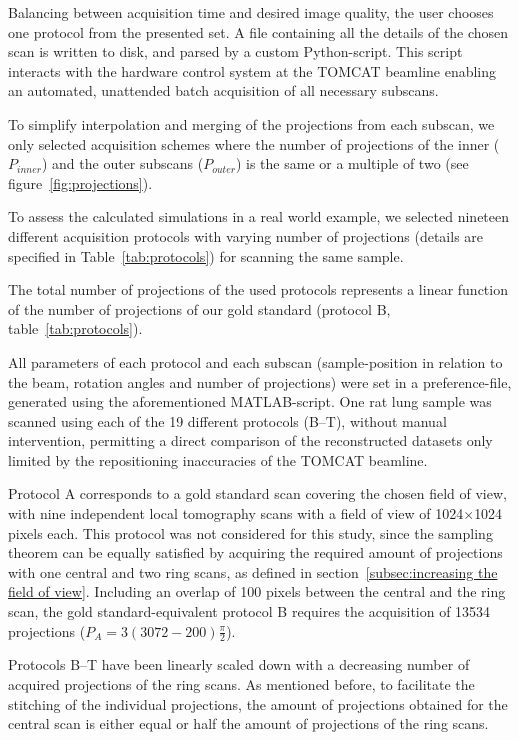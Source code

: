 Balancing between acquisition time and desired image quality, the user chooses one protocol from the presented set. A file containing all the details of the chosen scan is written to disk, and parsed by a custom Python-script. This script interacts with the hardware control system at the TOMCAT beamline enabling an automated, unattended batch acquisition of all necessary subscans.

To simplify interpolation and merging of the projections from each subscan, we only selected acquisition schemes where the number of projections of the inner ($P_{inner}$) and the outer subscans ($P_{outer}$) is the same or a multiple of two (see figure~\ref{fig:projections}).

To assess the calculated simulations in a real world example, we selected nineteen different acquisition protocols with varying number of projections (details are specified in Table~\ref{tab:protocols}) for scanning the same sample. 

The total number of projections of the used protocols represents a linear function of the number of projections of our gold standard (protocol B, table~\ref{tab:protocols}).

All parameters of each protocol and each subscan (sample-position in relation to the beam, rotation angles and number of projections) were set in a preference-file, generated using the aforementioned MATLAB-script. One rat lung sample was scanned using each of the 19 different protocols (B--T), without manual intervention, permitting a direct comparison of the reconstructed datasets only limited by the repositioning inaccuracies of the TOMCAT beamline.

Protocol A corresponds to a gold standard scan covering the chosen field of view, with nine independent local tomography scans with a field of view of 1024$\times$1024 pixels each. This protocol was not considered for this study, since the sampling theorem can be equally satisfied by acquiring the required amount of projections with one central and two ring scans, as defined in section~\ref{subsec:increasing the field of view}. Including an overlap of 100 pixels between the central and the ring scan, the gold standard-equivalent protocol B requires the acquisition of 13534 projections ($P_{A}=3(3072-200)\frac{\pi}{2}$).

Protocols B--T have been linearly scaled down with a decreasing number of acquired projections of the ring scans. As mentioned before, to facilitate the stitching of the individual projections, the amount of projections obtained for the central scan is either equal or half the amount of projections of the ring scans.

